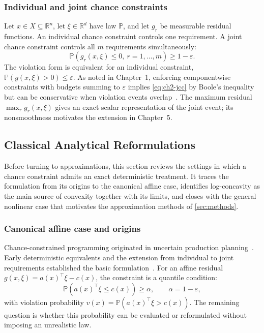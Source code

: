 \subsubsection{Individual and joint chance constraints}
\label{ssec:ch2-definitions}

Let $x\in X\subseteq\mathbb R^n$, let $\xi\in\mathbb R^d$ have law $\mathbb P$, and let $g_r$ be measurable residual functions. An individual chance constraint controls one requirement. A joint chance constraint controls all $m$ requirements simultaneously:
\begin{equation}
 \mathbb P(g_r(x,\xi)\leq0,\ r=1,\ldots,m)\geq1-\varepsilon.
 \label{eq:ch2-jcc}
\end{equation}
The violation form is equivalent for an individual constraint, $\mathbb P(g(x,\xi)>0)\leq\varepsilon$. As noted in Chapter~1, enforcing componentwise constraints with budgets summing to $\varepsilon$ implies \eqref{eq:ch2-jcc} by Boole's inequality but can be conservative when violation events overlap~\citep{prekopa1995}. The maximum residual $\max_r g_r(x,\xi)$ gives an exact scalar representation of the joint event; its nonsmoothness motivates the extension in Chapter~5.

\subsection{Classical Analytical Reformulations}
\label{sec:classical}

Before turning to approximations, this section reviews the settings in which a chance constraint admits an exact deterministic treatment. It traces the formulation from its origins to the canonical affine case, identifies log-concavity as the main source of convexity together with its limits, and closes with the general nonlinear case that motivates the approximation methods of \cref{sec:methods}.

\subsubsection{Canonical affine case and origins}
\label{ssec:origins}

Chance-constrained programming originated in uncertain production planning~\citep{charnes1958,charnes1959}. Early deterministic equivalents and the extension from individual to joint requirements established the basic formulation~\citep{charnes1963,miller1965}. For an affine residual
$g(x,\xi)=a(x)^\top\xi-c(x)$, the constraint is a quantile condition:
\begin{equation}
 \mathbb P(a(x)^\top\xi\leq c(x))\geq\alpha,
 \qquad \alpha=1-\varepsilon,
 \label{eq:ch2-affine}
\end{equation}
with violation probability $v(x)=\mathbb P(a(x)^\top\xi>c(x))$. The remaining question is whether this probability can be evaluated or reformulated without imposing an unrealistic law.

